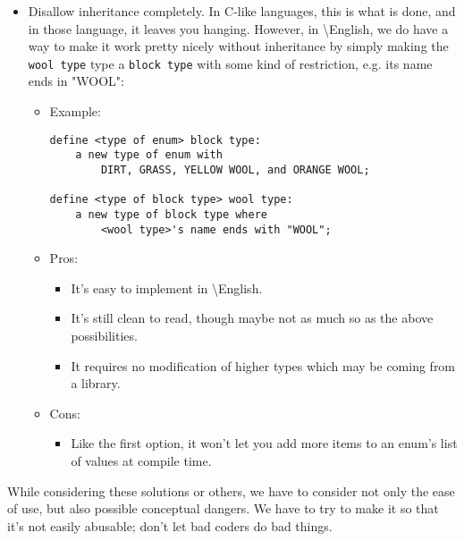 \documentclass{article}
\newcommand{\name}{\textbackslash{}English}
\begin{document}
\begin{itemize}
\begin{itemize}
\begin{lstlisting}
define <type of block type> wool type:
	a new type of block type with
		YELLOW WOOL and ORANGE WOOL;
		\end{lstlisting}
		\item Pros:
		\begin{itemize}
			\item It's easy to implement in \name{}.
			\item It's even cleaner to read.
		\end{itemize}
		\item Cons:
		\begin{itemize}
			\item It "obfuscates" potentially large parts of the list of \texttt{block type}'s values. Imagine that you're reading this code for the first time and you want to know what kinds of blocks are available. You would find the \texttt{block type} declaration and think that \texttt{DIRT} and \texttt{GRASS} are the only \texttt{block types}. Who would guess that there could be other things like \texttt{wool type} declared in other parts of the code in different files in different folders that could change that?
		\end{itemize}
	\end{itemize}
	\item Disallow inheritance completely. In C-like languages, this is what is done, and in those language, it leaves you hanging. However, in \name{}, we do have a way to make it work pretty nicely without inheritance by simply making the \texttt{wool type} type a \texttt{block type} with some kind of restriction, e.g. its name ends in "WOOL":\\
	\begin{itemize}
		\item Example:\\
		\begin{lstlisting}
define <type of enum> block type:
	a new type of enum with 
		DIRT, GRASS, YELLOW WOOL, and ORANGE WOOL;

define <type of block type> wool type:
	a new type of block type where
		<wool type>'s name ends with "WOOL";
		\end{lstlisting}
		\item Pros:
		\begin{itemize}
			\item It's easy to implement in \name{}.
			\item It's still clean to read, though maybe not as much so as the above possibilities.
			\item It requires no modification of higher types which may be coming from a library.
		\end{itemize}
		\item Cons:
		\begin{itemize}
			\item Like the first option, it won't let you add more items to an enum's list of values at compile time.
		\end{itemize}
	\end{itemize}
\end{itemize}
\indent While considering these solutions or others, we have to consider not only the ease of use, but also possible conceptual dangers. We have to try to make it so that it's not easily abusable; don't let bad coders do bad things.
\end{document}
